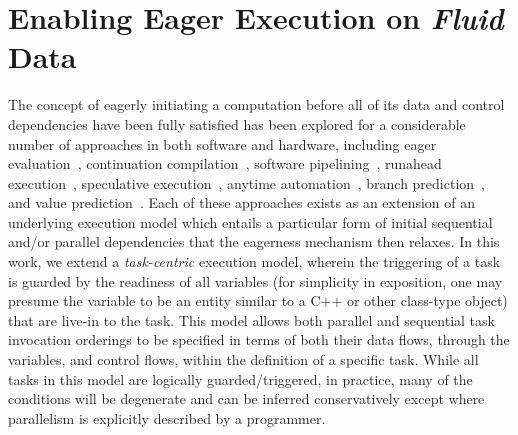 \vspace{-0.1in}
\section{Enabling Eager Execution on \emph{Fluid} Data}
\label{sec:eagermodel}
The concept of eagerly initiating a computation before all of its data and control dependencies have been fully satisfied has been explored for a considerable number of approaches in both software and hardware, including eager evaluation~\cite{eager}, continuation compilation~\cite{continuation}, software pipelining~\cite{lam1988software}, runahead execution~\cite{mutlu2003runahead}, speculative execution~\cite{speculative}, anytime automation~\cite{miguel2016anytime}, branch prediction~\cite{hu2003using}, and value prediction~\cite{lipasti1996value}. Each of these approaches exists as an extension of an underlying execution model which entails a particular form of initial sequential and/or parallel dependencies that the eagerness mechanism then relaxes. In this work, we extend a {\em task-centric} execution model, wherein the triggering of a task is guarded by the readiness of all variables (for simplicity in exposition, one may presume the variable to be an entity similar to a C++ or other class-type object) that are live-in to the task. This model allows both parallel and sequential task invocation orderings to be specified in terms of both their data flows, through the variables, and control flows, within the definition of a specific task. While all tasks in this model are logically guarded/triggered, in practice, many of the conditions will be degenerate and can be inferred conservatively except where parallelism is explicitly described by a programmer.

